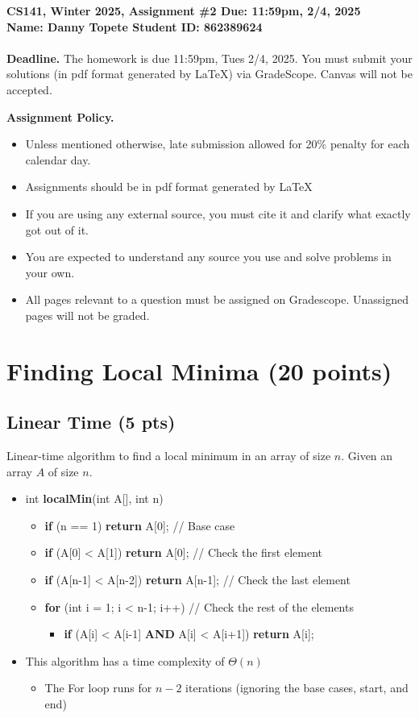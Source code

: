 \documentclass{article}[12pt]
\newcommand{\policy}[1]{#1}
\newcommand{\policy}[1]{}
\newcommand{\deadline}{11:59pm, 2/4, 2025}
\newcommand{\assigntitle}[1]{{
  \noindent \large \bf
  CS141, Winter 2025,
  Assignment \##1 \hfill Due: {\deadline}\\
  Name: Danny Topete %
  \hspace{2.5in}
  Student ID: 862389624 %
  \\
  [-.05in]
  \mbox{}\hrulefill \mbox{}\\}}
\begin{document}
\assigntitle{2}{}
\policy{\textbf{Deadline.} The homework is due 11:59pm, Tues 2/4, 2025. You must submit your solutions (in pdf
format generated by LaTeX) via GradeScope. Canvas will not be accepted.}\\
\date{}
\policy{\textbf{Assignment Policy.}
\begin{itemize}
    \item Unless mentioned otherwise, late submission allowed for 20\% penalty for each calendar day.
    \item Assignments should be in pdf format generated by LaTeX
    \item If you are using any external source, you must cite it and clarify what exactly got out of it.
    \item You are expected to understand any source you use and solve problems in your own.
    \item All pages relevant to a question must be assigned on Gradescope. Unassigned pages will not be graded.
\end{itemize}


}

\section{Finding Local Minima (20 points) }


\subsection{Linear Time (5 pts)}
Linear-time algorithm to find a local minimum in an array of size $n$.
Given an array $A$ of size $n$.
\begin{itemize}
  \item int \textbf{localMin}(int A[], int n)
    \begin{itemize}
      \item \textbf{if} (n == 1) \textbf{return} A[0]; // Base case
      \item \textbf{if} (A[0] < A[1]) \textbf{return} A[0]; // Check the first element
      \item \textbf{if} (A[n-1] < A[n-2]) \textbf{return} A[n-1]; // Check the last element
      \item \textbf{for} (int i = 1; i < n-1; i++) // Check the rest of the elements
        \begin{itemize}
          \item \textbf{if} (A[i] < A[i-1] \textbf{AND} A[i] < A[i+1]) \textbf{return} A[i];
        \end{itemize}
    \end{itemize}
  \item This algorithm has a time complexity of $\Theta(n)$
  \begin{itemize}
    \item The For loop runs for $n-2$ iterations (ignoring the base cases, start, and end)
  \end{itemize}
\end{itemize}
\end{document}
